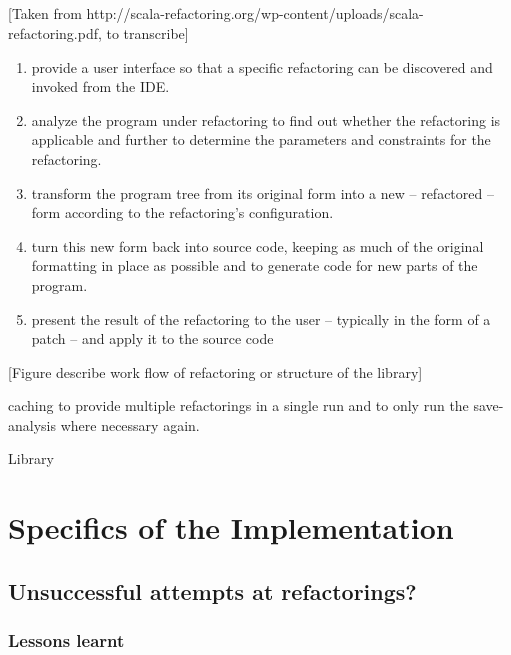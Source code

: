 \subsection{}
[Taken from http://scala-refactoring.org/wp-content/uploads/scala-refactoring.pdf, to transcribe]
\begin{enumerate}
\item provide a user interface so that a specific refactoring can be discovered and
invoked from the IDE.
\item analyze the program under refactoring to find out whether the refactoring is
applicable  and  further  to  determine  the  parameters  and  constraints  for  the
refactoring.
\item transform the program tree from its original form into a new – refactored – form
according to the refactoring’s configuration.
\item turn this new form back into source code,  keeping as much of the original
formatting in place as possible and to generate code for new parts of the program.
\item present the result of the refactoring to the user – typically in the form of a patch –
and apply it to the source code
\end{enumerate}

[Figure describe work flow of refactoring or structure of the library]

caching to provide multiple refactorings in a single run and to only run the save-analysis where necessary again. 

Library 
\subsection{}

\subsection{}

\section{Specifics of the Implementation}
\subsection{}
\subsection{Unsuccessful attempts at refactorings?}
\subsubsection{Lessons learnt}